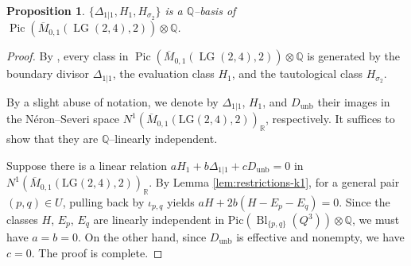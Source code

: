 \documentclass[10pt]{amsart}
\newtheorem{proposition}[theorem]{Proposition}
\theoremstyle{definition}
\newcommand{\LG}{\operatorname{LG}}
\newcommand{\Bl}{\operatorname{Bl}}
\newcommand{\QQ}{\mathbb{Q}}
\DeclareMathOperator{\unb}{unb}
\theoremstyle{plain} %
\begin{document}
\begin{proposition}\label{prop:Pic012}
$\{\Delta_{1|1},H_1,H_{\sigma_2}\}$ is a $\QQ$--basis of
$\operatorname{Pic}(\overline{M}_{0,1}(\LG(2,4),2))\otimes\QQ$.
\end{proposition}

\begin{proof}
By \cite[Proposition~1]{Op05}, every class in $\operatorname{Pic}(\overline{M}_{0,1}(\LG(2,4),2))\otimes\QQ$ is generated by the boundary divisor $\Delta_{1|1}$, the evaluation class $H_1$, and the tautological class $H_{\sigma_2}$. 

By a slight abuse of notation, we denote by  $\Delta_{1|1}$, $H_1$, and $D_{\unb}$ their images in the Néron--Severi space $N^1(\overline{M}_{0,1}(\mathrm{LG}(2,4),2))_{\mathbb{R}}$, respectively. It suffices to show that they are $\QQ$--linearly independent.  

Suppose there is a linear relation
\(
aH_1 + b\Delta_{1|1} + cD_{\unb} = 0
\)
in $N^1(\overline{M}_{0,1}(\mathrm{LG}(2,4),2))_{\mathbb{R}}$. By Lemma \ref{lem:restrictions-k1}, for a general pair $(p,q)\in U$, pulling back by $\iota_{p,q}$ yields
\(
a H + 2b (H - E_p - E_q) = 0
\).
Since the classes $H$, $E_p$, $E_q$ are linearly independent in $\mathrm{Pic}(\Bl_{\{p,q\}}(Q^3)) \otimes \mathbb{Q}$, we must have $a=b=0$. On the other hand, since $D_{\unb}$ is effective and nonempty, we have $c=0$. The proof is complete.
\end{proof}
\end{document}
